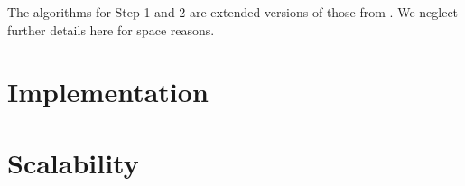 The algorithms for Step 1 and 2 are extended versions of those from \cite{iswc2016}. We neglect further details here for space reasons.

\section{Implementation}

\section{Scalability}